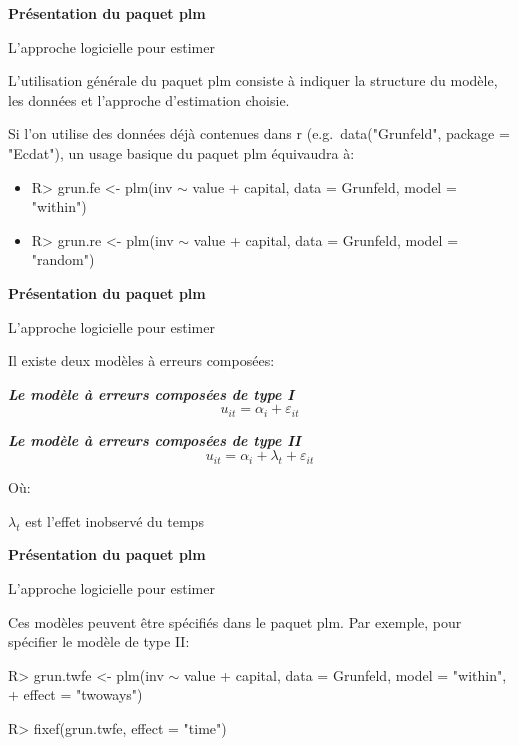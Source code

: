 \documentclass{beamer}
\begin{document}
\begin{frame}{\textbf{Pr\'esentation du paquet plm}}
\begin{block}{L'approche logicielle pour estimer}
\end{block}
L'utilisation g\'en\'erale du paquet plm consiste \`a indiquer la structure du mod\`ele, les donn\'ees et l'approche d'estimation choisie. \newline

Si l'on utilise des donn\'ees d\'ej\`a contenues dans r (e.g.\ data("Grunfeld", package = "Ecdat"), un usage basique du paquet plm \'equivaudra \`a:
\begin{itemize}
\item R> grun.fe <- plm(inv $\sim$ value + capital, data = Grunfeld, model = "within")
\item R> grun.re <- plm(inv $\sim$ value + capital, data = Grunfeld, model = "random")
\end{itemize}
\end{frame}
\begin{frame}{\textbf{Pr\'esentation du paquet plm}}
\begin{block}{L'approche logicielle pour estimer}
\end{block}
Il existe deux mod\`eles \`a erreurs compos\'ees: \newline

\textbf{\textit{Le mod\`ele \`a erreurs compos\'ees de type I}}
   \begin{equation*}
u_{it} = \alpha_i + \varepsilon_{it}
    \end{equation*}

\textbf{\textit{Le mod\`ele \`a erreurs compos\'ees de type II}}
   \begin{equation*}
u_{it} = \alpha_i + \lambda_t + \varepsilon_{it}
    \end{equation*}

  O\`u: 
\begin{description} 
 \item[$\lambda_t $ est l'effet inobserv\'e du temps]
\end{description} 
\end{frame}
\begin{frame}{\textbf{Pr\'esentation du paquet plm}}
\begin{block}{L'approche logicielle pour estimer}
\end{block}
Ces mod\`eles peuvent \^etre sp\'ecifi\'es dans le paquet plm. Par exemple, pour sp\'ecifier le mod\`ele de type II: \newline

R> grun.twfe <- plm(inv $\sim$ value + capital, data = Grunfeld, model = "within",
+    effect = "twoways") \newline

R> fixef(grun.twfe, effect = "time")
\end{frame}
\end{document}
